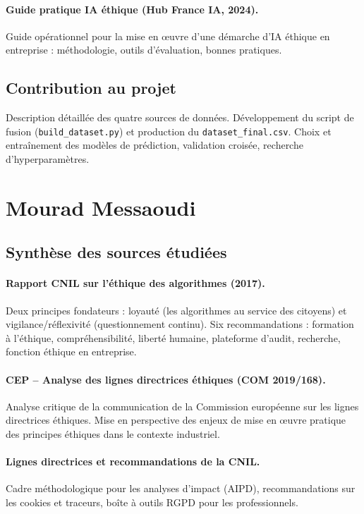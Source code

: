 \documentclass[12pt,a4paper]{article}
\begin{document}
\paragraph{Guide pratique IA éthique (Hub France IA, 2024).}
Guide opérationnel pour la mise en \oe uvre d'une démarche d'IA éthique en entreprise : méthodologie, outils d'évaluation, bonnes pratiques.

\subsection{Contribution au projet}

Description détaillée des quatre sources de données. Développement du script de fusion (\texttt{build\_dataset.py}) et production du \texttt{dataset\_final.csv}. Choix et entraînement des modèles de prédiction, validation croisée, recherche d'hyperparamètres.

\section{Mourad Messaoudi}

\subsection{Synthèse des sources étudiées}

\paragraph{Rapport CNIL sur l'éthique des algorithmes (2017).}
Deux principes fondateurs : loyauté (les algorithmes au service des citoyens) et vigilance/réflexivité (questionnement continu). Six recommandations : formation à l'éthique, compréhensibilité, liberté humaine, plateforme d'audit, recherche, fonction éthique en entreprise.

\paragraph{CEP -- Analyse des lignes directrices éthiques (COM 2019/168).}
Analyse critique de la communication de la Commission européenne sur les lignes directrices éthiques. Mise en perspective des enjeux de mise en \oe uvre pratique des principes éthiques dans le contexte industriel.

\paragraph{Lignes directrices et recommandations de la CNIL.}
Cadre méthodologique pour les analyses d'impact (AIPD), recommandations sur les cookies et traceurs, boîte à outils RGPD pour les professionnels.
\end{document}
